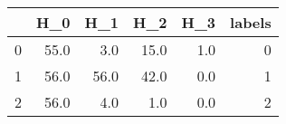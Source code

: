 \begin{tabular}{lrrrrr}
\toprule
{} &   H\_0 &   H\_1 &   H\_2 &  H\_3 &  labels \\
\midrule
0 &  55.0 &   3.0 &  15.0 &  1.0 &       0 \\
1 &  56.0 &  56.0 &  42.0 &  0.0 &       1 \\
2 &  56.0 &   4.0 &   1.0 &  0.0 &       2 \\
\bottomrule
\end{tabular}
